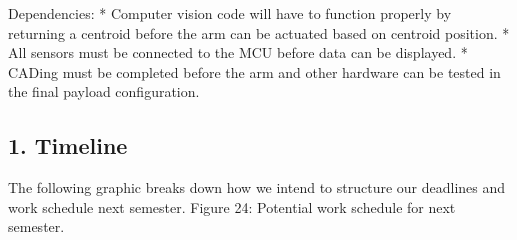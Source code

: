 ﻿\documentclass[10pt]{article}
\begin{document}
Dependencies:
* Computer vision code will have to function properly by returning a centroid before the arm can be actuated based on centroid position.
* All sensors must be connected to the MCU before data can be displayed.
* CADing must be completed before the arm and other hardware can be tested in the final payload configuration.

\subsection{1. Timeline}
The following graphic breaks down how we intend to structure our deadlines and work schedule next semester. 
%
%	
%
%	
%
%	 
%	
%
%	
%
%
%
%
%	         
%
%
%	
%
%	 
%	
%
%
%
%	 
%	
%
%
%
%	
%
%
%
%	
%
Figure 24: Potential work schedule for next semester. 
   
\end{document}

